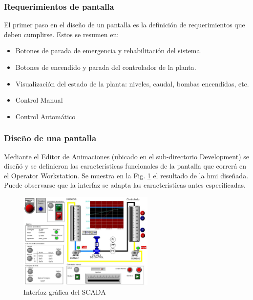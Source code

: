 \subsubsection{Requerimientos de pantalla}
El primer paso en el diseño de un pantalla es la definición de requerimientos
que deben cumplirse. Estos se resumen en:
\begin{itemize}
 \item Botones de parada de emergencia y rehabilitación del sistema.
 \item Botones de encendido y parada del controlador de la planta.
 \item Visualización del estado de la planta: niveles, caudal, bombas
 encendidas, etc.
 \item Control Manual
 \item Control Automático
\end{itemize}

\subsubsection{Diseño de una pantalla}
Mediante el Editor de Animaciones (ubicado en el sub-directorio
Development) se diseñó y se definieron las características funcionales de 
la pantalla que correrá en el Operator Workstation. Se muestra en la Fig. 
\ref{fig:hmiscada} el resultado de la \gls{hmi} diseñada.
Puede observarse que la interfaz se adapta las características antes
especificadas.
  \begin{figure}[!ht]
	\centering
	\includegraphics[width=0.6\textwidth]
	{Cap5-SCADA/images/hmiScada.jpeg}
	\caption{Interfaz gráfica del SCADA}
	\label{fig:hmiscada}
  \end{figure}


